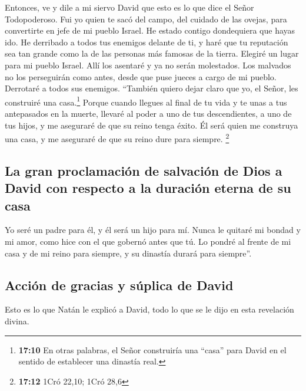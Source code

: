  Entonces, ve y dile a mi siervo David que esto es lo que
dice el Señor Todopoderoso. Fui yo quien te sacó del campo, del cuidado
de las ovejas, para convertirte en jefe de mi pueblo Israel.
 He estado contigo dondequiera que hayas ido. He derribado
a todos tus enemigos delante de ti, y haré que tu reputación sea tan
grande como la de las personas más famosas de la tierra. 
Elegiré un lugar para mi pueblo Israel. Allí los asentaré y ya no serán
molestados. Los malvados no los perseguirán como antes, 
desde que puse jueces a cargo de mi pueblo. Derrotaré a todos sus
enemigos. ``También quiero dejar claro que yo, el Señor, les construiré
una casa.\footnote{\textbf{17:10} En otras palabras, el Señor
  construiría una ``casa'' para David en el sentido de establecer una
  dinastía real.}  Porque cuando llegues al final de tu
vida y te unas a tus antepasados en la muerte, llevaré al poder a uno de
tus descendientes, a uno de tus hijos, y me aseguraré de que su reino
tenga éxito.  Él será quien me construya una casa, y me
aseguraré de que su reino dure para siempre. \footnote{\textbf{17:12}
  1Cró 22,10; 1Cró 28,6}

\hypertarget{la-gran-proclamaciuxf3n-de-salvaciuxf3n-de-dios-a-david-con-respecto-a-la-duraciuxf3n-eterna-de-su-casa}{%
\subsection{La gran proclamación de salvación de Dios a David con
respecto a la duración eterna de su
casa}\label{la-gran-proclamaciuxf3n-de-salvaciuxf3n-de-dios-a-david-con-respecto-a-la-duraciuxf3n-eterna-de-su-casa}}

 Yo seré un padre para él, y él será un hijo para mí.
Nunca le quitaré mi bondad y mi amor, como hice con el que gobernó antes
que tú.  Lo pondré al frente de mi casa y de mi reino
para siempre, y su dinastía durará para siempre''.

\hypertarget{acciuxf3n-de-gracias-y-suxfaplica-de-david}{%
\subsection{Acción de gracias y súplica de
David}\label{acciuxf3n-de-gracias-y-suxfaplica-de-david}}

 Esto es lo que Natán le explicó a David, todo lo que se
le dijo en esta revelación divina.

